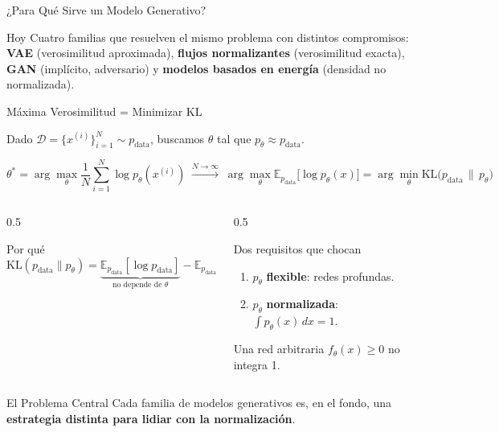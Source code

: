 \documentclass[aspectratio=169, 10pt]{beamer}
\providecommand{\E}{\mathbb{E}}
\newcommand{\KL}{\mathrm{KL}}
\newcommand{\pdata}{p_{\text{data}}}
\newcommand{\formula}[1]{%
	\begin{tcolorbox}[colback=UCMBlue!8, colframe=UCMBlue, arc=4pt,
		boxsep=2pt, left=6pt, right=6pt, top=3pt, bottom=3pt]
		#1
	\end{tcolorbox}
}
\begin{document}
\begin{frame}{¿Para Qu\'e Sirve un Modelo Generativo?}
	\vspace{0.4cm}

	\begin{block}{Hoy}
		Cuatro familias que resuelven el mismo problema con distintos compromisos:
		\textbf{VAE} (verosimilitud aproximada), \textbf{flujos normalizantes} (verosimilitud exacta),
		\textbf{GAN} (impl\'icito, adversario) y \textbf{modelos basados en energ\'ia} (densidad no normalizada).
	\end{block}

\end{frame}

\begin{frame}[shrink]{M\'axima Verosimilitud = Minimizar KL}

	Dado $\mathcal{D} = \{x^{(i)}\}_{i=1}^N \sim \pdata$, buscamos $\theta$ tal que $p_\theta \approx \pdata$.

	\formula{
		\[
		\theta^* = \arg\max_\theta \frac{1}{N}\sum_{i=1}^N \log p_\theta(x^{(i)})
		\;\xrightarrow{N\to\infty}\;
		\arg\max_\theta \E_{\pdata}\big[\log p_\theta(x)\big]
		= \arg\min_\theta \KL\big(\pdata \,\|\, p_\theta\big)
		\]
	}

	\begin{columns}[T]
		\begin{column}{0.5\textwidth}
			\begin{block}{Por qu\'e}
				\small
				\[
				\KL(\pdata\|p_\theta) = \underbrace{\E_{\pdata}[\log \pdata]}_{\text{no depende de }\theta} - \E_{\pdata}[\log p_\theta]
				\]
			\end{block}
		\end{column}

		\begin{column}{0.5\textwidth}
			\begin{block}{Dos requisitos que chocan}
				\small
				\begin{enumerate}
					\item $p_\theta$ \textbf{flexible}: redes profundas.
					\item $p_\theta$ \textbf{normalizada}: $\int p_\theta(x)\,dx = 1$.
				\end{enumerate}
				Una red arbitraria $f_\theta(x) \ge 0$ no integra 1.
			\end{block}
		\end{column}
	\end{columns}

	\vspace{0.2cm}

	\begin{alertblock}{El Problema Central}
		Cada familia de modelos generativos es, en el fondo, una \textbf{estrategia distinta para lidiar con la normalizaci\'on}.
	\end{alertblock}

\end{frame}
\end{document}
